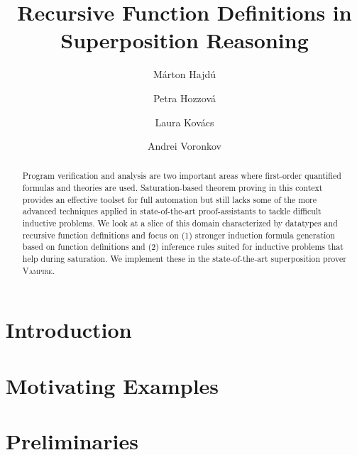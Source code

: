 \documentclass[runningheads]{llncs}
\begin{document}
%
\title{Recursive Function Definitions in Superposition Reasoning}
%
\titlerunning{ }
%
\author{M\'arton Hajd\'{u} \and Petra Hozzov\'a \and
  Laura Kov\'acs \and Andrei Voronkov}
%
\authorrunning{ }
%

%

\maketitle              %
%
\begin{abstract}

Program verification and analysis are two important areas where first-order quantified formulas and theories are used. Saturation-based theorem proving in this context provides an effective toolset for full automation but still lacks some of the more advanced techniques applied in state-of-the-art proof-assistants to tackle difficult inductive problems. We look at a slice of this domain characterized by datatypes and recursive function definitions and focus on (1) stronger induction formula generation based on function definitions and (2) inference rules suited for inductive problems that help during saturation. We implement these in the state-of-the-art superposition prover \textsc{Vampire}.
\end{abstract}

\section{Introduction}


\section{Motivating Examples}
\label{sec:motivating}


\section{Preliminaries}
\label{sec:preliminaries}

\end{document}
